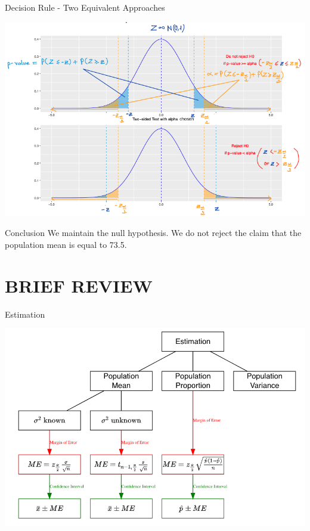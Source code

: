 \documentclass[
  10pt,
  ignorenonframetext,
]{beamer}
\begin{document}
\begin{frame}{Decision Rule - Two Equivalent Approaches}
\protect\hypertarget{decision-rule---two-equivalent-approaches}{}
\begin{center}\includegraphics[width=0.9\linewidth]{pictures/Two-tailedTestRule} \end{center}
\end{frame}

\begin{frame}{Conclusion}
\protect\hypertarget{conclusion}{}
We maintain the null hypothesis. We do not reject the claim that the
population mean is equal to 73.5.
\end{frame}

\hypertarget{brief-review}{%
\section{BRIEF REVIEW}\label{brief-review}}

\begin{frame}{Estimation}
\protect\hypertarget{estimation}{}
\begin{center}\includegraphics[width=0.9\linewidth]{pictures/EstimationGuide} \end{center}
\end{frame}
\end{document}
